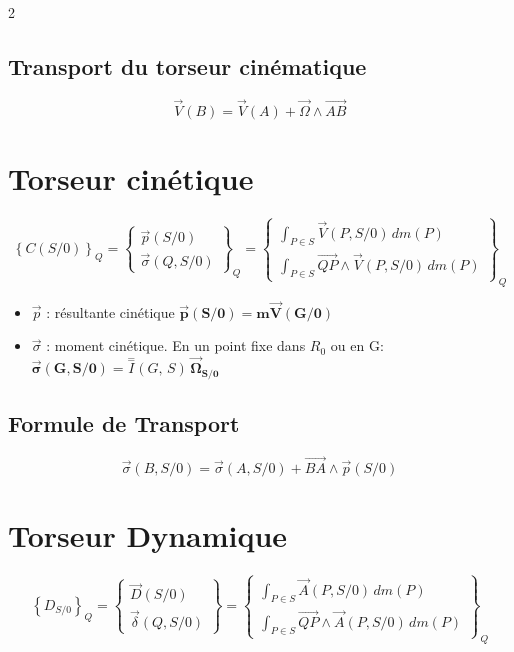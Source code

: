 \documentclass[10pt,a4paper]{article}
\renewcommand{\vec}{\overrightarrow}
\newcommand{\Inertie}[2]{\overset{=}{I}(#1,\,#2)}
\begin{document}
\begin{multicols}{2}
            \subsection*{Transport du torseur cinématique}

            \[
            \vec V(B) =
            \vec V(A)
            + \vec \Omega \wedge \vec{AB}
            \]

    \section{Torseur cinétique}

            \[
            \left\{C(S/0)\right\}_Q =
            \begin{Bmatrix}
            \vec p (S/0) \\
            \vec \sigma (Q, S/0)
            \end{Bmatrix}_Q
            =
            \begin{Bmatrix}
            \int_{P\in S} \vec V(P, S/0) \, dm(P) \\
            \int_{P\in S} \vec{QP} \wedge \vec{V}(P, S/0) \, dm(P)
            \end{Bmatrix}_Q
            \]

            \begin{itemize}
                \item $\vec p$ : résultante cinétique \quad $\bm{\vec p (S/0) = m \vec V (G/0)}$
                \item $\vec \sigma$ : moment cinétique. En un point fixe dans $R_0$ ou en G: \\
                $\bm{\vec\sigma (G, S/0) =} \Inertie{G}{S} \bm{\, \vec\Omega_{S/0}}$
            \end{itemize}

            \subsection*{Formule de Transport}

                $$ \vec \sigma (B, S/0) = \vec \sigma (A, S/0) + \vec{BA} \wedge \vec p(S/0) $$

        \section{Torseur Dynamique}

            $$
                \left\{D_{S/0}\right\}_Q =
                \begin{Bmatrix}
                    \vec D (S/0) \\
                    \vec \delta (Q, S/0)
                \end{Bmatrix}
                =
                \begin{Bmatrix}
                    \int_{P\in S} \vec A(P, S/0) \, dm(P) \\
                    \int_{P\in S} \vec{QP} \wedge \vec A(P, S/0) \, dm(P)
                \end{Bmatrix}_Q
            $$


\end{multicols}
\end{document}
